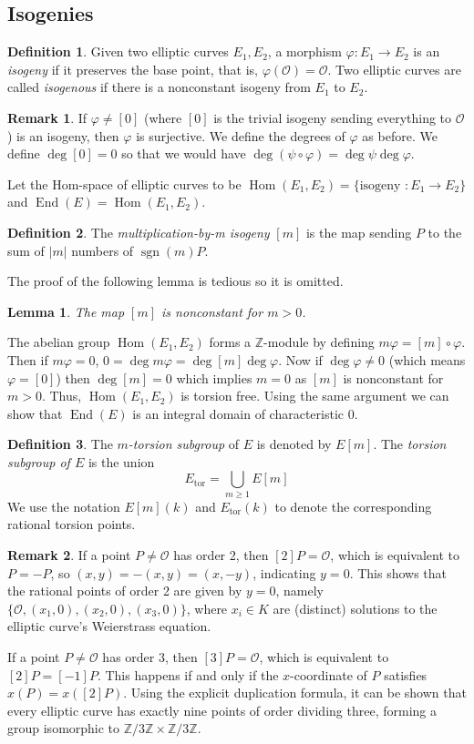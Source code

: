 \documentclass[12pt]{article}
\newtheorem{lemma}{Lemma}[subsection]
\theoremstyle{remark}
\theoremstyle{definition}
\newtheorem{remark}{Remark}[subsection]
\newtheorem{definition}{Definition}[subsection]
\newcommand{\Z}[0]{\mathbb{Z}}
\newcommand{\ecO}[0]{\mathcal O}
\newcommand{\sgn}[0]{\operatorname{sgn}}
\newcommand{\Hom}[0]{\operatorname{Hom}}
\newcommand{\End}[0]{\operatorname{End}}
\begin{document}
    \subsection{Isogenies}    
    \begin{definition}
        Given two elliptic curves $E_1,E_2$, a morphism $\varphi:E_1\to E_2$ is an \textit{isogeny} if it preserves the base point, that is, $\varphi(\ecO)=\ecO$. Two elliptic curves are called \textit{isogenous} if there is a nonconstant isogeny from $E_1$ to $E_2$.
    \end{definition}
    \begin{remark}
        If $\varphi\neq[0]$ (where $[0]$ is the trivial isogeny sending everything to $\ecO$) is an isogeny, then $\varphi$ is surjective. We define the degrees of $\varphi$ as before. We define $\deg[0]=0$ so that we would have $\deg(\psi\circ\varphi)=\deg\psi\deg\varphi$.
    \end{remark}
    Let the Hom-space of elliptic curves to be $\Hom(E_1,E_2)=\{\text{isogeny }:E_1\to E_2\}$ and $\operatorname{End}(E)=\Hom(E_1,E_2)$.
    \begin{definition}
        The \textit{multiplication-by-m isogeny} $[m]$ is the map sending $P$ to the sum of $|m|$ numbers of $\sgn(m)P$.
    \end{definition}
    The proof of the following lemma is tedious so it is omitted.
    \begin{lemma}
        The map $[m]$ is nonconstant for $m>0$.
    \end{lemma}
    The abelian group $\Hom(E_1, E_2)$ forms a $\Z$-module by defining $m\varphi=[m]\circ\varphi$. Then if $m\varphi=0$, $0=\deg m\varphi=\deg[m]\deg\varphi$. Now if $\deg\varphi\neq 0$ (which means $\varphi=[0]$) then $\deg[m]=0$ which implies $m=0$ as $[m]$ is nonconstant for $m>0$. Thus, $\Hom(E_1,E_2)$ is torsion free. Using the same argument we can show that $\End(E)$ is an integral domain of characteristic $0$.
    \begin{definition}
        The \textit{$m$-torsion subgroup} of $E$ is denoted by $E[m]$. The \textit{torsion subgroup of $E$} is the union
        \[E_{\text{tor}}=\bigcup_{m\geqslant 1}E[m]\]
        We use the notation $E[m](k)$ and $E_{\text{tor}}(k)$ to denote the corresponding rational torsion points.
    \end{definition}
    \begin{remark}
        If a point $P\neq\mathcal{O}$ has order 2, then $[2]P=\mathcal{O}$, which is equivalent to $P=-P$, so $(x,y)=-(x,y)=(x,-y)$, indicating $y=0$. This shows that the rational points of order 2 are given by $y=0$, namely $\{\mathcal{O},(x_1,0),(x_2,0),(x_3,0)\}$, where $x_i\in K$ are (distinct) solutions to the elliptic curve's Weierstrass equation.
         
        If a point $P\neq\mathcal{O}$ has order 3, then $[3]P=\mathcal{O}$, which is equivalent to $[2]P=[-1]P$. This happens if and only if the $x$-coordinate of $P$ satisfies $x(P)=x([2]P)$. Using the explicit duplication formula, it can be shown that every elliptic curve has exactly nine points of order dividing three, forming a group isomorphic to $\Z/3\Z\times\Z/3\Z$.
    \end{remark}
\end{document}
